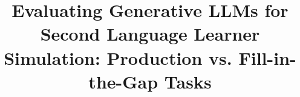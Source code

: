 \title{Evaluating Generative LLMs for Second Language Learner Simulation: Production vs. Fill-in-the-Gap Tasks}
